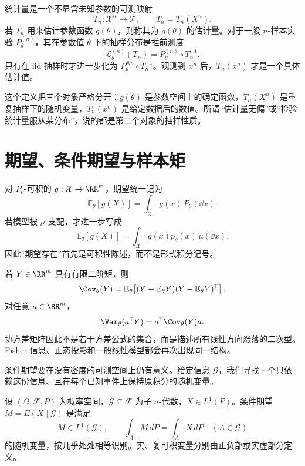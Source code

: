 \begin{definition}
统计量是一个不显含未知参数的可测映射
\[
 T_n:\mathcal X^n\to\mathcal T,
 \qquad
 T_n=T_n(X^n).
\]
若 $T_n$ 用来估计参数函数 $g(\theta)$，则称其为 $g(\theta)$ 的估计量。对于一般 $n$-样本实验 $P_\theta^{(n)}$，其在参数值 $\theta$ 下的抽样分布是推前测度
\begin{equation*}\mathcal L_\theta^{(n)}(T_n)
 =P_\theta^{(n)}\circ T_n^{-1}.
\end{equation*}
只有在 iid 抽样时才进一步化为 $P_\theta^{\otimes n}\circ T_n^{-1}$。观测到 $x^n$ 后，$T_n(x^n)$ 才是一个具体估计值。
\end{definition}

这个定义把三个对象严格分开：$g(\theta)$ 是参数空间上的确定函数，$T_n(X^n)$ 是重复抽样下的随机变量，$T_n(x^n)$ 是给定数据后的数值。所谓“估计量无偏”或“检验统计量服从某分布”，说的都是第二个对象的抽样性质。

\section{期望、条件期望与样本矩}

对 $P_\theta$-可积的 $g:\mathcal X\to\RR^m$，期望统一记为
\begin{equation*}\mathbb E_\theta[g(X)]
 =\int_{\mathcal X}g(x)\,P_\theta(\dd x).
\end{equation*}
若模型被 $\mu$ 支配，才进一步写成
\[
 \mathbb E_\theta[g(X)]
 =\int_{\mathcal X}g(x)p_\theta(x)\,\mu(\dd x).
\]
因此“期望存在”首先是可积性陈述，而不是形式积分记号。

若 $Y\in\RR^m$ 具有有限二阶矩，则
\[
 \Cov_\theta(Y)
 =\mathbb E_\theta\!
 \left[(Y-\mathbb E_\theta Y)(Y-\mathbb E_\theta Y)^{\mathsf T}\right].
\]
对任意 $a\in\RR^m$，
\[
 \Var_\theta(a^{\mathsf T}Y)
 =a^{\mathsf T}\Cov_\theta(Y)a.
\]
协方差矩阵因此不是若干方差公式的集合，而是描述所有线性方向涨落的二次型。Fisher 信息、正态投影和一般线性模型都会再次出现同一结构。

条件期望要在没有密度的可测空间上仍有意义。给定信息 $\mathcal G$，我们寻找一个只依赖这份信息、且在每个已知事件上保持原积分的随机变量。

\begin{definition}[条件期望]
设 $(\Omega,\mathcal F,P)$ 为概率空间，$\mathcal G\subseteq\mathcal F$ 为子 $\sigma$-代数，$X\in L^1(P)$。条件期望 $M=E(X\mid\mathcal G)$ 是满足
\[
 M\in L^1(\mathcal G),\qquad
 \int_A M\,dP=\int_A X\,dP\quad(A\in\mathcal G)
\]
的随机变量，按几乎处处相等识别。实、复可积变量分别由正负部或实虚部分定义。
\end{definition}

